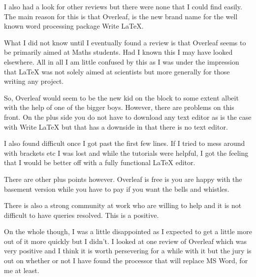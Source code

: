 \documentclass[paper=a4, fontsize=11pt]{scrartcl} %
\numberwithin{equation}{section} %
\numberwithin{figure}{section} %
\numberwithin{table}{section} %
\begin{document}
I also had a look for other reviews but there were none that I could find easily. The main reason for this is that Overleaf, is the new brand name for the well known word processing package Write LaTeX.

What I did not know until I eventually found a review is that Overleaf seems to be primarily aimed at Maths students. Had I known this I may have looked elsewhere. All in all I am little confused by this as I was under the impression that LaTeX was not solely aimed at scientists but more generally for those writing any project.


So, Overleaf would seem to be the new kid on the block to some extent albeit with the help of one of the bigger boys. However, there are problems on this front. On the plus side you do not have to download any text editor as is the case with Write LaTeX but that has a downside in that there is no text editor.

I also found difficult once I got past the first few lines. If I tried to mess around with brackets etc I was lost and while the tutorials were helpful, I got the feeling that I would be better off with a fully functional LaTeX editor.

There are other plus points however. Overleaf is free is you are happy with the basement version while you have to pay if you want the bells and whistles. 

There is also a strong community at work who are willing to help and it is not difficult to have queries resolved. This is a positive. 

On the whole though, I was a little disappointed as I expected to get a little more out of it more quickly but I didn't. I looked at one review of Overleaf which was very positive and I think it is worth persevering for a while with it but the jury is out on whether or not I have found the processor that will replace MS Word, for me at least. 





\end{document}
